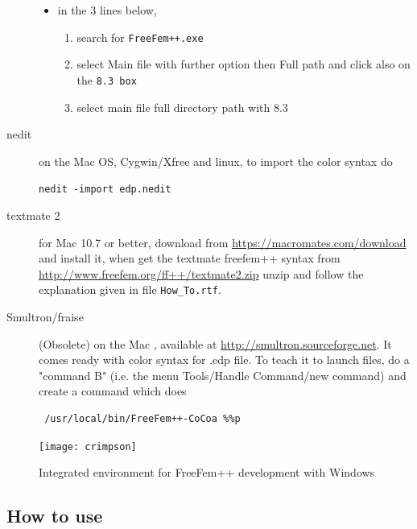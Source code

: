 \documentclass[a4paper,twoside,12pt]{book}
\begin{document}
\begin{description}
\begin{itemize}
\item in the 3 lines below,
\begin{enumerate}
\item search for \texttt{FreeFem++.exe}
\item select Main file with further option then Full path and click also on the \texttt{8.3 box}
\item select main file full directory path with 8.3
\end{enumerate}
\end{itemize}
\item[nedit] on the Mac OS, Cygwin/Xfree and linux, to import the color syntax do

\verb!nedit -import edp.nedit!

 \item[textmate 2] for  Mac 10.7 or better, download from \url{https://macromates.com/download} and install it, when  get the textmate freefem++ syntax from
  \url{http://www.freefem.org/ff++/textmate2.zip} unzip and follow the explanation given in file \texttt{How\_To.rtf}.
  
 \item[Smultron/fraise] (Obsolete) on the Mac , available at \url{http://smultron.sourceforge.net}. It comes ready with color syntax for .edp file.  To teach it to launch \freefempp files, do a "command B" (i.e. the menu Tools/Handle Command/new command) and create a command which does
\begin{verbatim}
 /usr/local/bin/FreeFem++-CoCoa %%p
\end{verbatim}

\end{description}
%
\begin{figure}[htbp]
\begin{center}
\texttt{[image: crimpson]}
\caption{ Integrated environment for FreeFem++ development with Windows
   \label{fig:mi}}
\end{center}
\end{figure}


\subsection{How to use \freefempp}

\end{document}
